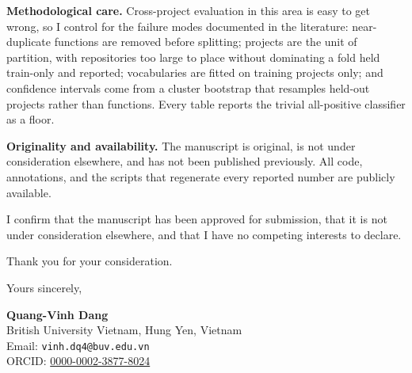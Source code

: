 \documentclass[11pt]{article}
\begin{document}
\vspace{1em}
\noindent\textbf{Methodological care.}
Cross-project evaluation in this area is easy to get wrong, so I control for the failure modes documented in the literature: near-duplicate functions are removed before splitting; projects are the unit of partition, with repositories too large to place without dominating a fold held train-only and reported; vocabularies are fitted on training projects only; and confidence intervals come from a cluster bootstrap that resamples held-out projects rather than functions. Every table reports the trivial all-positive classifier as a floor.

\vspace{1em}
\noindent\textbf{Originality and availability.}
The manuscript is original, is not under consideration elsewhere, and has not been published previously. All code, annotations, and the scripts that regenerate every reported number are publicly available.

I confirm that the manuscript has been approved for submission, that it is not under consideration elsewhere, and that I have no competing interests to declare.

Thank you for your consideration.

\vspace{2em}

\noindent Yours sincerely,

\vspace{1.5em}

\noindent\textbf{Quang-Vinh Dang}\\
British University Vietnam, Hung Yen, Vietnam\\
Email: \texttt{vinh.dq4@buv.edu.vn}\\
ORCID: \href{https://orcid.org/0000-0002-3877-8024}{0000-0002-3877-8024}
\end{document}
